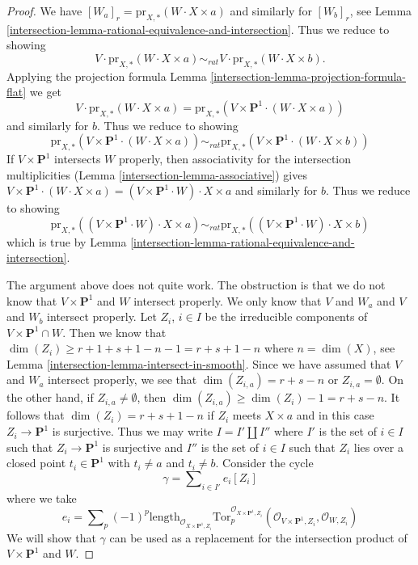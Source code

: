 \begin{proof}

We have $[W_a]_r = \text{pr}_{X,*}(W \cdot X \times a)$ and similarly for
$[W_b]_r$, see Lemma \ref{intersection-lemma-rational-equivalence-and-intersection}.
Thus we reduce to showing
$$
V \cdot \text{pr}_{X,*}( W \cdot X \times a) \sim_{rat} V \cdot
\text{pr}_{X,*}( W \cdot X\times b).
$$
Applying the projection formula
Lemma \ref{intersection-lemma-projection-formula-flat} we get
$$
V \cdot \text{pr}_{X,*}( W \cdot X\times a) =
\text{pr}_{X,*}(V \times \mathbf{P}^1 \cdot (W \cdot X\times a))
$$
and similarly for $b$. Thus we reduce to showing
$$
\text{pr}_{X,*}(V \times \mathbf{P}^1 \cdot (W \cdot X\times a))
\sim_{rat}
\text{pr}_{X,*}(V \times \mathbf{P}^1 \cdot (W \cdot X\times b))
$$
If $V \times \mathbf{P}^1$ intersects $W$ properly, then
associativity for the intersection multiplicities
(Lemma \ref{intersection-lemma-associative})
gives $V \times \mathbf{P}^1 \cdot (W \cdot X\times a) =
(V \times \mathbf{P}^1 \cdot W) \cdot X \times a$
and similarly for $b$.  Thus we reduce to showing
$$
\text{pr}_{X,*}((V \times \mathbf{P}^1 \cdot W) \cdot X\times a)
\sim_{rat}
\text{pr}_{X,*}((V \times \mathbf{P}^1 \cdot W) \cdot X\times b)
$$
which is true by Lemma \ref{intersection-lemma-rational-equivalence-and-intersection}.

\medskip\noindent
The argument above does not quite work. The obstruction is that
we do not know that $V \times \mathbf{P}^1$ and $W$ intersect properly.
We only know that $V$ and $W_a$ and $V$ and $W_b$ intersect properly.
Let $Z_i$, $i \in I$ be the irreducible components of
$V \times \mathbf{P}^1 \cap W$. Then we know that
$\dim(Z_i) \geq r + 1 + s + 1 - n - 1 = r + s + 1 - n$ where $n = \dim(X)$, see
Lemma \ref{intersection-lemma-intersect-in-smooth}. Since we have assumed
that $V$ and $W_a$ intersect properly, we see that
$\dim(Z_{i, a}) = r + s - n$ or $Z_{i, a} = \emptyset$.
On the other hand, if $Z_{i, a} \not = \emptyset$, then
$\dim(Z_{i, a}) \geq \dim(Z_i) - 1 = r + s - n$.
It follows that $\dim(Z_i) = r + s + 1 - n$ if $Z_i$ meets $X \times a$
and in this case $Z_i \to \mathbf{P}^1$ is surjective.
Thus we may write $I = I' \amalg I''$ where $I'$ is the set of $i \in I$
such that $Z_i \to \mathbf{P}^1$ is surjective and $I''$ is the set of
$i \in I$ such that $Z_i$ lies over a closed point $t_i \in \mathbf{P}^1$
with $t_i \not = a$ and $t_i \not = b$. Consider the cycle
$$
\gamma = \sum\nolimits_{i \in I'} e_i [Z_i]
$$
where we take
$$
e_i = \sum\nolimits_p (-1)^p
\text{length}_{\mathcal{O}_{X \times \mathbf{P}^1, Z_i}}
\text{Tor}_p^{\mathcal{O}_{X \times \mathbf{P}^1, Z_i}}(
\mathcal{O}_{V \times \mathbf{P}^1, Z_i}, \mathcal{O}_{W, Z_i})
$$
We will show that $\gamma$ can be used as a replacement for
the intersection product of $V \times \mathbf{P}^1$ and $W$.


\end{proof}
